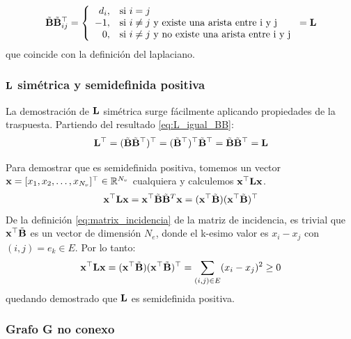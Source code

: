 \documentclass{article}
\begin{document}
\begin{equation}
    \label{eq:L_igual_BB}
    \tilde{\mathbf{B}}\tilde{\mathbf{B}}^\top_{ij} = \left\lbrace
    \begin{array}{r l}
        d_i, & \text{si $i=j$}                                        \\
        -1,  & \text{si $i\neq j$ y existe una arista entre i y j}    \\
        0,   & \text{si $i\neq j$ y no existe una arista entre i y j}
    \end{array}
    \right. = \mathbf{L}
\end{equation}
que coincide con la definición del laplaciano.

\subsubsection{$\mathbf{L}$ simétrica y semidefinida positiva}

La demostración de $\mathbf{L}$ simétrica surge fácilmente aplicando propiedades de la traspuesta. Partiendo del resultado \eqref{eq:L_igual_BB}:
\begin{equation}
    \mathbf{L}^\top = (\tilde{\mathbf{B}}\tilde{\mathbf{B}}^\top)^\top = (\tilde{\mathbf{B}}^\top)^\top \tilde{\mathbf{B}}^\top = \tilde{\mathbf{B}}\tilde{\mathbf{B}}^\top = \mathbf{L}
\end{equation}

Para demostrar que es semidefinida positiva, tomemos un vector $\mathbf{x} = [x_1, x_2, \dots, x_{N_v}]^\top \in \mathbb{R}^{N_v}$
cualquiera y calculemos $\mathbf{x}^\top\mathbf{L}\mathbf{x}$.
\begin{equation*}
    \mathbf{x}^\top\mathbf{L}\mathbf{x} = \mathbf{x}^\top \tilde{\mathbf{B}}\tilde{\mathbf{B}}^T\mathbf{x} = (\mathbf{x}^\top\tilde{\mathbf{B}})(\mathbf{x}^\top\tilde{\mathbf{B}})^\top
\end{equation*}
De la definición \eqref{eq:matrix_incidencia} de la matriz de incidencia, es trivial que $\mathbf{x}^\top \tilde{\mathbf{B}}$ es un vector de dimensión $N_e$, donde el k-esimo valor es $x_i-x_j$ con $(i,j) = e_k \in E$.  Por lo tanto:
\begin{equation}
    \mathbf{x}^\top\mathbf{L}\mathbf{x} = (\mathbf{x}^\top\tilde{\mathbf{B}})(\mathbf{x}^\top\tilde{\mathbf{B}})^\top = \sum_{(i,j)\in E} (x_i-x_j)^2 \geq 0
\end{equation}
quedando demostrado que $\mathbf{L}$ es semidefinida positiva.

\subsubsection{Grafo G no conexo}
\end{document}
